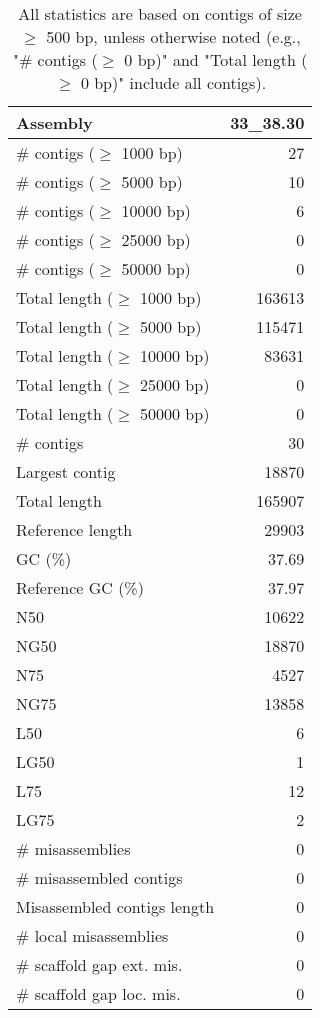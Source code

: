 \documentclass[12pt,a4paper]{article}
\begin{document}
\begin{table}[ht]
\begin{center}
\caption{All statistics are based on contigs of size $\geq$ 500 bp, unless otherwise noted (e.g., "\# contigs ($\geq$ 0 bp)" and "Total length ($\geq$ 0 bp)" include all contigs).}
\begin{tabular}{|l*{1}{|r}|}
\hline
Assembly & 33\_38.30 \\ \hline
\# contigs ($\geq$ 1000 bp) & 27 \\ \hline
\# contigs ($\geq$ 5000 bp) & 10 \\ \hline
\# contigs ($\geq$ 10000 bp) & 6 \\ \hline
\# contigs ($\geq$ 25000 bp) & 0 \\ \hline
\# contigs ($\geq$ 50000 bp) & 0 \\ \hline
Total length ($\geq$ 1000 bp) & 163613 \\ \hline
Total length ($\geq$ 5000 bp) & 115471 \\ \hline
Total length ($\geq$ 10000 bp) & 83631 \\ \hline
Total length ($\geq$ 25000 bp) & 0 \\ \hline
Total length ($\geq$ 50000 bp) & 0 \\ \hline
\# contigs & 30 \\ \hline
Largest contig & 18870 \\ \hline
Total length & 165907 \\ \hline
Reference length & 29903 \\ \hline
GC (\%) & 37.69 \\ \hline
Reference GC (\%) & 37.97 \\ \hline
N50 & 10622 \\ \hline
NG50 & 18870 \\ \hline
N75 & 4527 \\ \hline
NG75 & 13858 \\ \hline
L50 & 6 \\ \hline
LG50 & 1 \\ \hline
L75 & 12 \\ \hline
LG75 & 2 \\ \hline
\# misassemblies & 0 \\ \hline
\# misassembled contigs & 0 \\ \hline
Misassembled contigs length & 0 \\ \hline
\# local misassemblies & 0 \\ \hline
\# scaffold gap ext. mis. & 0 \\ \hline
\# scaffold gap loc. mis. & 0 \\ \hline

\end{tabular}
\end{center}
\end{table}
\end{document}
